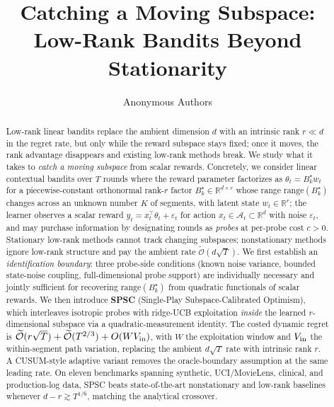 \documentclass{article}
\title{Catching a Moving Subspace:\\Low-Rank Bandits Beyond Stationarity}
\author{%
  Anonymous Authors%
}
\newcommand{\R}{\mathbb{R}}
\newcommand{\cA}{\mathcal{A}}
\newcommand{\tilO}{\widetilde{\mathcal{O}}}
\newcommand{\range}{\mathrm{range}}
\begin{document}
\maketitle

\begin{abstract}

  Low-rank linear bandits replace the ambient dimension $d$ with an
  intrinsic rank $r \ll d$ in the regret rate, but only while the
  reward subspace stays fixed; once it moves, the rank advantage
  disappears and existing low-rank methods break. We study what it
  takes to \emph{catch a moving subspace} from scalar rewards.
  Concretely, we consider linear contextual bandits over $T$ rounds
  where the reward parameter factorizes as $\theta_t = B_k^\star w_t$
  for a piecewise-constant orthonormal rank-$r$ factor
  $B_k^\star\in\R^{d\times r}$ whose range $\range(B_k^\star)$
  changes across an unknown number $K$ of segments, with latent
  state $w_t\in\R^r$; the learner
  observes a scalar reward $y_t = x_t^\top\theta_t + \varepsilon_t$
  for action $x_t\in\cA_t\subset\R^d$ with noise $\varepsilon_t$,
  and may purchase information by designating rounds as \emph{probes}
  at per-probe cost $c>0$. Stationary low-rank methods cannot track
  changing subspaces; nonstationary methods ignore low-rank structure
  and pay the ambient rate $\tilO(d\sqrt T)$. We first establish an
  \emph{identification boundary}: three probe-side conditions (known
  noise variance, bounded state-noise coupling, full-dimensional probe
  support) are individually necessary and jointly sufficient for
  recovering $\range(B_k^\star)$ from quadratic functionals of scalar
  rewards. We then introduce \textbf{SPSC} (Single-Play
  Subspace-Calibrated Optimism), which interleaves isotropic probes
  with ridge-UCB exploitation \emph{inside} the learned $r$-dimensional
  subspace via a quadratic-measurement identity. The costed dynamic
  regret is $\tilO(r\sqrt T)+\tilO(T^{2/3})+O(WV_{\rm in})$, with $W$
  the exploitation window and $V_{\rm in}$ the within-segment path
  variation, replacing the ambient $d\sqrt T$ rate with intrinsic
  rank $r$. A CUSUM-style adaptive variant removes the
  oracle-boundary assumption at the same leading rate. On eleven
  benchmarks spanning synthetic, UCI/MovieLens, clinical, and
  production-log data, SPSC beats state-of-the-art nonstationary and
  low-rank baselines whenever $d-r\gtrsim T^{1/6}$, matching the
  analytical crossover.


\end{abstract}
\end{document}
